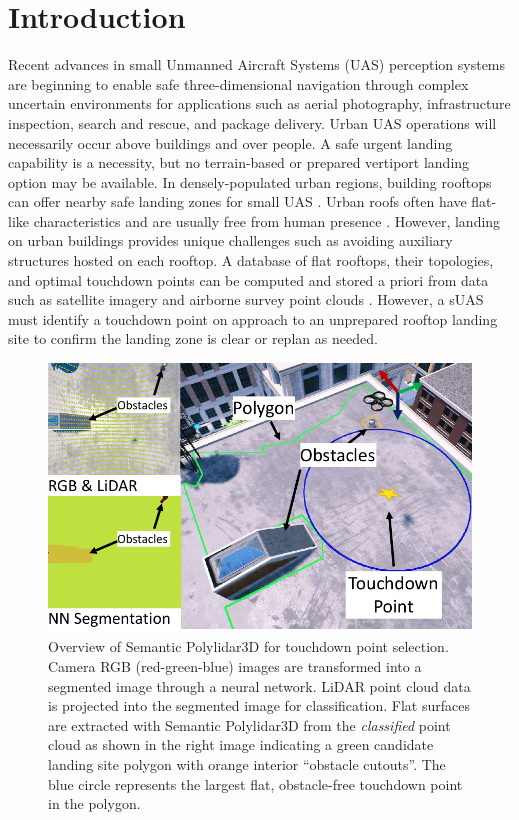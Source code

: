 \section{Introduction}

Recent advances in small Unmanned Aircraft Systems (UAS) perception systems are beginning to enable safe three-dimensional navigation through complex uncertain environments for applications such as aerial photography, infrastructure inspection, search and rescue, and package delivery. Urban UAS operations will necessarily occur above buildings and over people. A safe urgent landing capability is a necessity, but no terrain-based or prepared vertiport landing option \cite{patterson_timely_2014, atkins_emergency_2006, di_donato_evaluating_2017} may be available.  In densely-populated urban regions, building rooftops can offer nearby safe landing zones for small UAS \cite{desaraju_vision-based_2015}. Urban roofs often have flat-like characteristics and are usually free from human presence \cite{castagno_roof_2018}. However, landing on urban buildings provides unique challenges such as avoiding auxiliary structures hosted on each rooftop.  A database of flat rooftops, their topologies, and optimal touchdown points can be computed and stored a priori from data such as satellite imagery and airborne survey point clouds \cite{castagno_map-based_2021}. However, a sUAS must identify a touchdown point on approach to an unprepared rooftop landing site to confirm the landing zone is clear or replan as needed.

\begin{figure}[!ht]
    \centering
    \includegraphics[width=0.70\columnwidth]{chapter_6_landingsim/figs/main_photo.pdf}
    \caption[Overview of Semantic Polylidar3D]{Overview of Semantic Polylidar3D for touchdown point selection. Camera RGB (red-green-blue) images are transformed into a segmented image through a neural network. LiDAR point cloud data is projected into the segmented image for classification. Flat surfaces are extracted with Semantic Polylidar3D \cite{castagno_polylidar3d_2020} from the \textit{classified} point cloud as shown in the right image indicating a green candidate landing site polygon with orange interior ``obstacle cutouts''. The blue circle represents the largest flat, obstacle-free touchdown point in the polygon.}
    \label{fig:ch6_ls_overview}
\end{figure}

